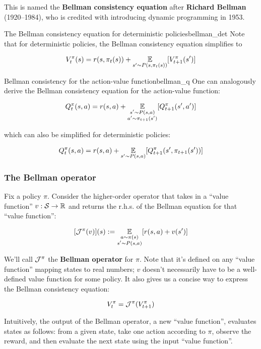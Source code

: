 \documentclass[../main/main]{subfiles}
\begin{document}
This is named the \textbf{Bellman consistency equation} after \textbf{Richard Bellman} (1920--1984), who is credited with introducing dynamic programming in 1953.

\begin{remark}{The Bellman consistency equation for deterministic policies}{bellman_det}
    Note that for deterministic policies, the Bellman consistency equation simplifies to

    \[
        V_t^\pi(s) = r(s, \pi_t(s)) + \operatorname*{\mathbb{E}}_{s' \sim P(s, \pi_t(s))} [V_{t+1}^\pi(s')]
    \]
\end{remark}

\begin{remark}{Bellman consistency for the action-value function}{bellman_q}
    One can analogously derive the Bellman consistency equation for the action-value function:

    \[
        Q_t^\pi(s, a) = r(s, a) + \operatorname*{\mathbb{E}}_{\substack{s' \sim P(s, a) \\ a' \sim \pi_{t+1}(s')}} [Q_{t+1}^\pi(s', a')]
    \]

    which can also be simplified for deterministic policies:

    \[
        Q_t^\pi(s, a) = r(s, a) + \operatorname*{\mathbb{E}}_{s' \sim P(s, a)} [Q_{t+1}^\pi(s', \pi_{t+1}(s'))]
    \]
\end{remark}

\subsubsection{The Bellman operator}
\label{sec:bellman_operator}

Fix a policy $\pi$. Consider the higher-order operator that takes in a ``value function'' $v : \mathcal{S} \to \mathbb{R}$ and returns the r.h.s. of the Bellman equation for that ``value function'':

\[
    [\mathcal{J}^{\pi}(v)](s) := \operatorname*{\mathbb{E}}_{\substack{a \sim \pi(s) \\ s' \sim P(s, a)}} [r(s, a) + v(s')]
\]

We'll call $\mathcal{J}^\pi$ the \textbf{Bellman operator} for $\pi$. Note that it's defined on any ``value function'' mapping states to real numbers; $v$ doesn't necessarily have to be a well-defined value function for some policy. It also gives us a concise way to express the Bellman consistency equation:

\[
    V_t^\pi = \mathcal{J}^{\pi}(V_{t+1}^\pi)
\]

Intuitively, the output of the Bellman operator, a new ``value function'', evaluates states as follows: from a given state, take one action according to $\pi$, observe the reward, and then evaluate the next state using the input ``value function''.
\end{document}

